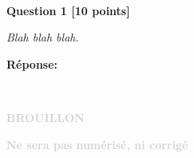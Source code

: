 \documentclass[10pt]{article}
\newcommand{\verso}
{
\
\newpage
\thispagestyle{empty}

\vspace*{\fill}

\begin{center}
{\fontsize{50}{60}\selectfont \bf \textcolor{lightgray}{BROUILLON}}

\bigskip

{\huge \bf \textcolor{lightgray}{Ne sera pas num\'eris\'e, ni corrig\'e}}

\end{center}

\vspace*{\fill}

\addtocounter{page}{-1}
\newpage
}
\begin{document}
\

\

\

{\large \bf Question 1 [10 points]}

\bigskip

{\em Blah blah blah.}

\bigskip

{\bf R\'eponse:}


\verso
\end{document}
